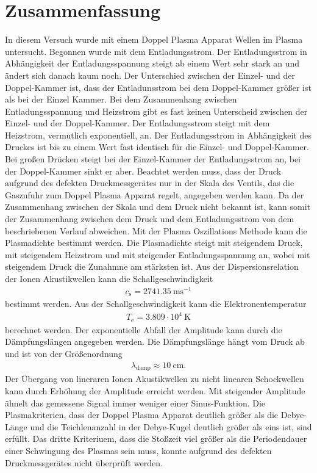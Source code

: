 \section{Zusammenfassung}
In diesem Versuch wurde mit einem Doppel Plasma Apparat Wellen im Plasma untersucht. Begonnen wurde mit dem Entladungsstrom. Der Entladungsstrom in Abhängigkeit der Entladungsspannung steigt ab einem Wert sehr stark an und ändert sich danach kaum noch. Der Unterschied zwischen der Einzel- und der Doppel-Kammer ist, dass der Entladunsstrom bei dem Doppel-Kammer größer ist als bei der Einzel Kammer. Bei dem Zusammenhang zwischen Entladungsspannung und Heizstrom gibt es fast keinen Unterscheid zwischen der Einzel- und der Doppel-Kammer.  Der Entladungsstrom steigt mit dem Heizstrom, vermutlich exponentiell, an. Der Entladungsstrom in Abhängigkeit des Druckes ist bis zu einem Wert fast identisch für die Einzel- und Doppel-Kammer. Bei großen Drücken steigt bei der Einzel-Kammer der Entladungsstrom an, bei der Doppel-Kammer sinkt er aber. Beachtet werden muss, dass der Druck aufgrund des defekten Druckmessgerätes nur in der Skala des Ventils, das die Gaszufuhr zum Doppel Plasma Apparat regelt, angegeben werden kann. Da der Zusammenhang zwischen der Skala und dem Druck nicht bekannt ist, kann somit der Zusammenhang zwischen dem Druck und dem Entladungsstrom  von dem beschriebenen Verlauf abweichen. Mit der Plasma Oszillations Methode kann die Plasmadichte bestimmt werden. Die Plasmadichte steigt mit steigendem Druck, mit steigendem Heizstrom und mit steigender Entladungsspannung an, wobei mit steigendem Druck die Zunahmne am stärksten ist. Aus der Dispersionsrelation der Ionen Akustikwellen kann die Schallgeschwindigkeit
\begin{align}
  c_{\mathrm{s}}= 2741.35\ \mathrm{ms}^{-1}
  \end{align}
  bestimmt werden. Aus der Schallgeschwindigkeit kann die Elektronentemperatur
  \begin{align}
    T_{\mathrm{e}}=3.809 \cdot 10^4\ \mathrm{K}
    \end{align}
  berechnet werden. Der exponentielle Abfall der Amplitude kann durch die Dämpfungslängen angegeben werden. Die Dämpfungslänge hängt vom Druck ab und ist von der Größenordnung
  \begin{align}
    \lambda_{\mathrm{damp}} \approx 10\ \mathrm{cm}.
  \end{align}
  Der Übergang von lineraren Ionen Akustikwellen zu nicht linearen Schockwellen kann durch Erhöhung der Amplitude erreicht werden. Mit steigender Amplitude ähnelt das gemessene Signal immer weniger einer Sinus-Funktion. Die Plasmakriterien, dass der Doppel Plasma Apparat deutlich größer als die Debye-Länge und die Teichlenanzahl in der Debye-Kugel deutlich größer als eins ist, sind erfüllt. Das dritte Kriteriuem, dass die Stoßzeit viel größer als die Periodendauer einer Schwingung des Plasmas sein muss, konnte aufgrund des defekten Druckmessgerätes nicht überprüft werden. 
  
